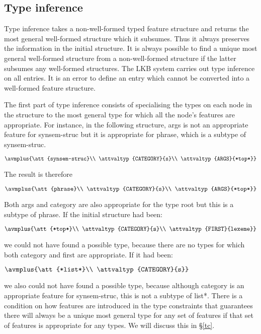 \documentclass[12pt]{report}
\begin{document}
\subsection{Type inference}

Type inference takes a non-well-formed
typed feature structure and returns the most general
well-formed structure which it subsumes.  Thus
it always preserves the information in the initial structure.
It is always possible to find a unique most general
well-formed structure from a non-well-formed structure
if the latter subsumes any well-formed structures.
The LKB system carries
out type inference on all entries.  It is an error to
define an entry which cannot be converted into a well-formed 
feature structure.  

The first part of type inference consists of specialising
the types on each node in the structure to the most general
type for which all the node's features are appropriate.
For instance, in the following structure,
{\feature args} is not an appropriate feature for {\type synsem-struc}
but it is appropriate for {\type phrase}, which is a subtype of 
{\type synsem-struc}.  
\begin{ex}
{\tiny $\avmplus{\att{synsem-struc}\\
\attvaltyp{CATEGORY}{s}\\
\attvaltyp{ARGS}{*top*}}$}
\end{ex}
The result is therefore
\begin{ex}
{\tiny $\avmplus{\att{phrase}\\
\attvaltyp{CATEGORY}{s}\\
\attvaltyp{ARGS}{*top*}}$}
\end{ex}
Both {\feature args} and {\feature category} 
are also appropriate for the type {\type root}
but this is a subtype of {\type phrase}.
If the initial structure had been:
\begin{ex}
{\tiny $\avmplus{\att{*top*}\\
\attvaltyp{CATEGORY}{s}\\
\attvaltyp{FIRST}{lexeme}}$}
\end{ex}
we could not have found a possible type, because there are
no types for which both {\feature category} and 
{\feature first} are appropriate.
If it had been:
\begin{ex}
{\tiny $\avmplus{\att{*list*}\\
\attvaltyp{CATEGORY}{s}}$}
\end{ex}
we also could not have found a possible type, because
although {\feature category} 
is an appropriate feature for {\type synsem-struc},
this is not a subtype of {\type *list*}.
There is a condition on
how features are introduced in the type constraints
that guarantees there will always be a unique most general
type for any set of features if that set of features is appropriate
for any types.
We will discuss this in \S\ref{tc}. 
\end{document}
